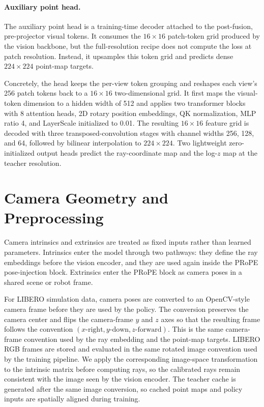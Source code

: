 \paragraph{Auxiliary point head.}
The auxiliary point head is a training-time decoder attached to the post-fusion, pre-projector visual tokens. It consumes the $16\times16$ patch-token grid produced by the vision backbone, but the full-resolution recipe does not compute the loss at patch resolution. Instead, it upsamples this token grid and predicts dense $224\times224$ point-map targets.

Concretely, the head keeps the per-view token grouping and reshapes each view's 256 patch tokens back to a $16\times16$ two-dimensional grid. It first maps the visual-token dimension to a hidden width of 512 and applies two transformer blocks with 8 attention heads, 2D rotary position embeddings, QK normalization, MLP ratio 4, and LayerScale initialized to 0.01. The resulting $16\times16$ feature grid is decoded with three transposed-convolution stages with channel widths 256, 128, and 64, followed by bilinear interpolation to $224\times224$. Two lightweight zero-initialized output heads predict the ray-coordinate map and the log-$z$ map at the teacher resolution.

\section{Camera Geometry and Preprocessing}
\label{app:camera_geometry}

Camera intrinsics and extrinsics are treated as fixed inputs rather than learned parameters. Intrinsics enter the model through two pathways: they define the ray embeddings before the vision encoder, and they are used again inside the PRoPE pose-injection block. Extrinsics enter the PRoPE block as camera poses in a shared scene or robot frame.

For LIBERO simulation data, camera poses are converted to an OpenCV-style camera frame before they are used by the policy. The conversion preserves the camera center and flips the camera-frame $y$ and $z$ axes so that the resulting frame follows the convention $(x\text{-right},y\text{-down},z\text{-forward})$. This is the same camera-frame convention used by the ray embedding and the point-map targets. LIBERO RGB frames are stored and evaluated in the same rotated image convention used by the training pipeline. We apply the corresponding image-space transformation to the intrinsic matrix
before computing rays, so the calibrated rays remain consistent with the image seen by the vision
encoder. The teacher cache is generated after the same image conversion, so cached point maps and
policy inputs are spatially aligned during training.

